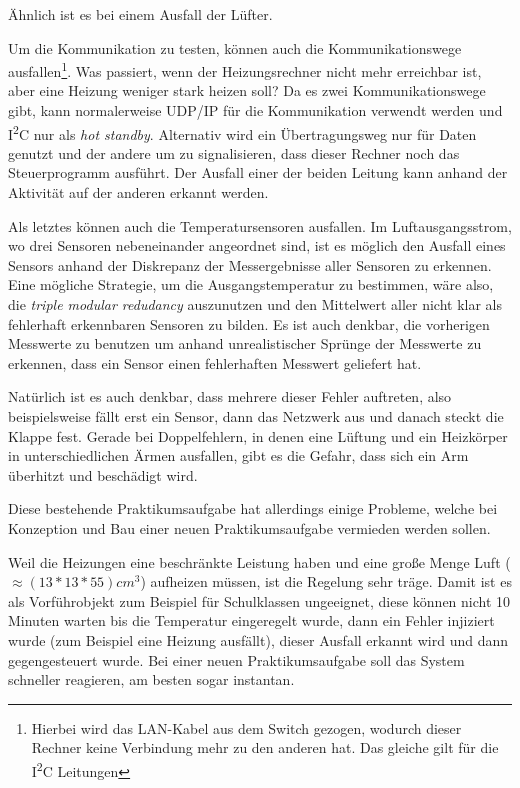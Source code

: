 {\"{A}}hnlich ist es bei einem Ausfall der L{\"{u}}fter. 

Um die Kommunikation zu testen, k{\"{o}}nnen auch die Kommunikationswege ausfallen\footnote{Hierbei
wird das LAN-Kabel aus dem Switch gezogen, wodurch dieser Rechner keine Verbindung mehr zu den anderen hat.
Das gleiche gilt f{\"{u}}r die I\textsuperscript{2}C Leitungen}.
Was passiert, wenn der Heizungsrechner nicht mehr erreichbar ist, aber eine Heizung weniger stark heizen soll?
Da es zwei Kommunikationswege gibt, kann normalerweise UDP/IP f{\"{u}}r die Kommunikation verwendt werden
und I\textsuperscript{2}C nur als \textit{hot standby}. Alternativ wird ein {\"{U}}bertragungsweg nur
f{\"{u}}r Daten genutzt und der andere um zu signalisieren, dass dieser Rechner noch das
Steuerprogramm ausf{\"{u}}hrt. Der Ausfall einer der beiden Leitung kann anhand der Aktivit{\"{a}}t auf der
anderen erkannt werden.

Als letztes k{\"{o}}nnen auch die Temperatursensoren ausfallen. Im Luftausgangsstrom, wo drei Sensoren 
nebeneinander angeordnet sind, ist es m{\"{o}}glich den
Ausfall eines Sensors anhand der Diskrepanz der Messergebnisse aller Sensoren zu erkennen. Eine m{\"{o}}gliche 
Strategie, um die Ausgangstemperatur zu
bestimmen, w{\"{a}}re also, die \textit{triple modular redudancy} auszunutzen und den Mittelwert aller nicht klar als 
fehlerhaft erkennbaren Sensoren zu bilden.
Es ist auch denkbar, die vorherigen Messwerte zu benutzen um anhand unrealistischer Spr{\"{u}}nge der Messwerte zu 
erkennen, dass ein Sensor einen fehlerhaften Messwert geliefert hat.

Nat{\"{u}}rlich ist es auch denkbar, dass mehrere dieser Fehler auftreten, also beispielsweise f{\"{a}}llt
erst ein Sensor, dann das Netzwerk aus und danach steckt die Klappe fest.
Gerade bei Doppelfehlern, in denen eine L{\"{u}}ftung und ein Heizk{\"{o}}rper in unterschiedlichen {\"{A}}rmen 
ausfallen, gibt es die Gefahr, dass sich ein Arm {\"{u}}berhitzt und besch{\"{a}}digt wird.

Diese bestehende Praktikumsaufgabe hat allerdings einige Probleme, welche bei Konzeption und Bau einer neuen
Praktikumsaufgabe vermieden werden sollen.

Weil die Heizungen eine beschr{\"{a}}nkte Leistung haben und eine gro{\ss}e Menge Luft 
($ \approx (13*13*55)cm^3$) aufheizen m{\"{u}}ssen, ist die Regelung sehr tr{\"{a}}ge. Damit ist es als
Vorf{\"{u}}hrobjekt zum Beispiel f{\"{u}}r Schulklassen ungeeignet, diese k{\"{o}}nnen nicht 10 Minuten warten
bis die Temperatur eingeregelt wurde, dann ein Fehler injiziert wurde (zum Beispiel eine Heizung
ausf{\"{a}}llt), dieser Ausfall erkannt wird und dann gegengesteuert wurde. Bei einer neuen Praktikumsaufgabe
soll das System schneller reagieren, am besten sogar instantan.

